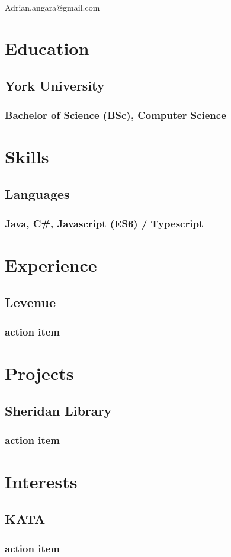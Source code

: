 \documentclass{article}
\makeatletter
\renewcommand{\maketitle}{
	\begin{center}
		{\huge\bfseries\theauthor}
		
		Adrian.angara@gmail.com
	\end{center}
}
\makeatother
\begin{document}
\author{Adrian Angara}

\maketitle


\section{Education}
\subsection{York University}
\subsubsection{Bachelor of Science (BSc), Computer Science}

\section{Skills}
\subsection{Languages}
\subsubsection{Java, C#, Javascript (ES6) / Typescript}
\section{Experience}
\subsection{Levenue}
\subsubsection{action item}
\section{Projects}
\subsection{Sheridan Library}
\subsubsection{action item}
\section{Interests}
\subsection{KATA}
\subsubsection{action item}
\end{document}
